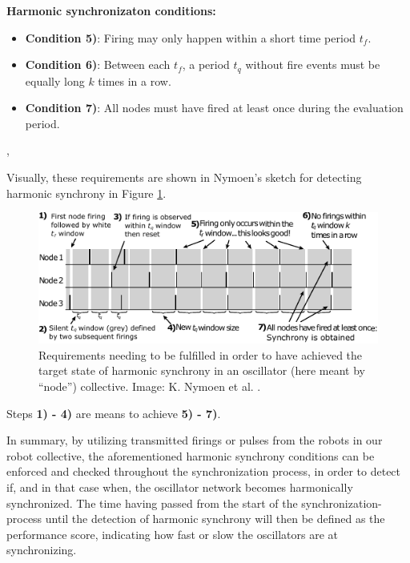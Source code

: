 	\textbf{Harmonic synchronizaton conditions:}
	
	\begin{itemize}
		\item[] \textbf{Condition 5)}: Firing may only happen within a short time period $t_f$.
		\item[] \textbf{Condition 6)}: Between each $t_f$, a period $t_q$ without fire events must be equally long $k$ times in a row.
		\item[] \textbf{Condition 7)}: All nodes must have fired at least once during the evaluation period.
	\end{itemize}
	\sep
	
	Visually, these requirements are shown in Nymoen's sketch for detecting harmonic synchrony in Figure \ref{fig:nymoen_harm_sync_detect}.
	
	\begin{figure}[ht!]
		\centering
		\includegraphics[width=\linewidth]{Assets/DocSegments/Chapters/Baseline/Figures/Illustrations/NymoenHarmonicSyncDetectionSchema.pdf}
		\caption[Nymoen et al.'s harmonic synchrony detection schema.]{Requirements needing to be fulfilled in order to have achieved the target state of harmonic synchrony in an oscillator (here meant by ``node'') collective. Image: K. Nymoen et al. \cite{nymoen_synch}.}
		\label{fig:nymoen_harm_sync_detect}
	\end{figure}
	
	Steps \textbf{1) - 4)} are means to achieve \textbf{5) - 7)}.
	
	In summary, by utilizing transmitted firings or pulses from the robots in our robot collective, the aforementioned harmonic synchrony conditions can be enforced and checked throughout the synchronization process, in order to detect if, and in that case when, the oscillator network becomes harmonically synchronized. The time having passed from the start of the synchronization-process until the detection of harmonic synchrony will then be defined as the performance score, indicating how fast or slow the oscillators are at synchronizing.
	
